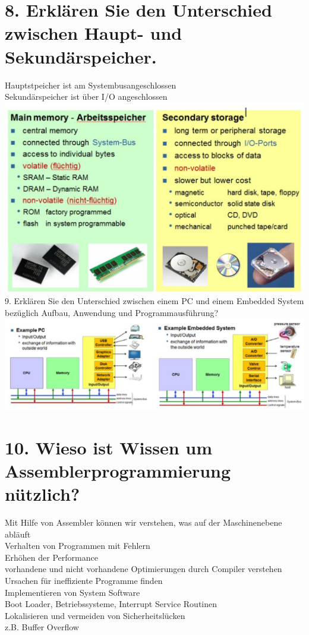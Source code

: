 \documentclass[10pt]{article}
\begin{document}
\section*{8. Erklären Sie den Unterschied zwischen Haupt- und Sekundärspeicher.}
Hauptstpeicher ist am Systembusangeschlossen\\
Sekundärspeicher ist über I/O angeschlossen\\
\includegraphics[max width=\textwidth, center]{2025_01_02_f240dc33b50f25226887g-3(2)}\\
9. Erklären Sie den Unterschied zwischen einem PC und einem Embedded System bezüglich Aufbau, Anwendung und Programmausführung?\\
\includegraphics[max width=\textwidth, center]{2025_01_02_f240dc33b50f25226887g-4}

\section*{10. Wieso ist Wissen um Assemblerprogrammierung nützlich?}
Mit Hilfe von Assembler können wir verstehen, was auf der Maschinenebene abläuft\\
Verhalten von Programmen mit Fehlern\\
Erhöhen der Performance\\
vorhandene und nicht vorhandene Optimierungen durch Compiler verstehen\\
Ursachen für ineffiziente Programme finden\\
Implementieren von System Software\\
Boot Loader, Betriebssysteme, Interrupt Service Routinen\\
Lokalisieren und vermeiden von Sicherheitslücken\\
z.B. Buffer Overflow
\end{document}
